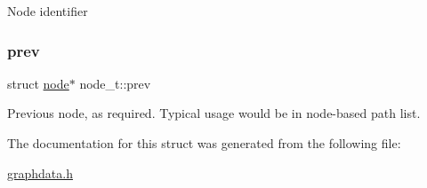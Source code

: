 Node identifier \mbox{\label{structnode__t_a19f92ca38ac9aac34b076878b629398d}} 
\subsubsection{\texorpdfstring{prev}{prev}}
{\footnotesize\ttfamily struct \hyperlink{graphdata_8h_a85b4f4124a5616dea92c9e8a221a8db5}{node}$\ast$ node\+\_\+t\+::prev}



Previous node, as required. Typical usage would be in node-\/based path list. 



The documentation for this struct was generated from the following file\+:\begin{DoxyCompactItemize}
\item 
\hyperlink{graphdata_8h}{graphdata.\+h}\end{DoxyCompactItemize}
